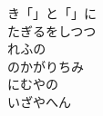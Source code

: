 \documentclass[10pt,b5j]{tarticle} %
\begin{document}
\begin{enumerate}
\begin{minipage}[c]{\blocksize}
        \vspace{\linespace}
        \item
        き「」と「」に\\
        たぎるをしつつ\\
        れふの\\
        のかがりちみ\\
        にむやの\\
        いざやへん
    
    \end{minipage}
\end{enumerate} %
\end{document}
